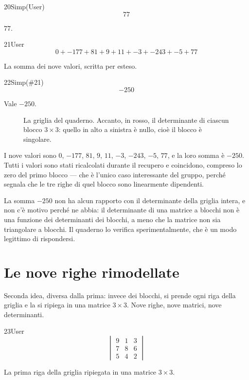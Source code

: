 \begin{espr}{20}{Simp(User)}{}
\[
77
\]
\end{espr}
$77$.

\begin{espr}{21}{User}{}
\[
0 + -177 + 81 + 9 + 11 + -3 + -243 + -5 + 77
\]
\end{espr}
La somma dei nove valori, scritta per esteso.

\begin{espr}{22}{Simp(\#21)}{}
\[
-250
\]
\end{espr}
Vale $-250$.

\begin{figure}[htbp]
  \centering
  
  \caption{La griglia del quaderno. Accanto, in rosso, il determinante di ciascun blocco $3\times3$: quello in alto a sinistra è nullo, cioè il blocco è singolare.}
  \label{fig:sudoku_griglia}
\end{figure}

I nove valori sono $0$, $-177$, $81$, $9$, $11$, $-3$, $-243$, $-5$, $77$, e la loro somma è $-250$. Tutti i valori sono stati ricalcolati durante il recupero e coincidono, compreso lo zero del primo blocco — che è l'unico caso interessante del gruppo, perché segnala che le tre righe di quel blocco sono linearmente dipendenti.

La somma $-250$ non ha alcun rapporto con il determinante della griglia intera, e non c'è motivo perché ne abbia: il determinante di una matrice a blocchi non è una funzione dei determinanti dei blocchi, a meno che la matrice non sia triangolare a blocchi. Il quaderno lo verifica sperimentalmente, che è un modo legittimo di rispondersi.

\section{Le nove righe rimodellate}

Seconda idea, diversa dalla prima: invece dei blocchi, si prende ogni riga della griglia e la si ripiega in una matrice $3\times3$. Nove righe, nove matrici, nove determinanti.

\begin{espr}{23}{User}{}
\[
\begin{vmatrix} 9 & 1 & 3 \\ 7 & 8 & 6 \\ 5 & 4 & 2 \end{vmatrix}
\]
\end{espr}
La prima riga della griglia ripiegata in una matrice $3\times3$.

